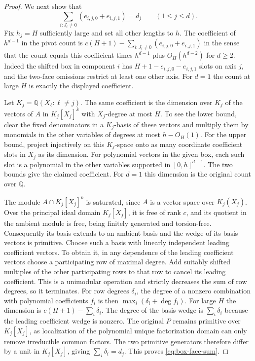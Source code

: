 \documentclass[11pt,a4paper,reqno]{amsart}
\theoremstyle{definition}
\theoremstyle{remark}
\numberwithin{equation}{section}
\begin{document}
\begin{proof}
We next show that
\begin{equation}\label{eq:box-face-sum}
 \sum_{i:J_i\ne0}(e_{i,j,0}+e_{i,j,1})=d_j
 \qquad (1\leq j\leq d).
\end{equation}
Fix \(h_j=H\) sufficiently large and set all other lengths to \(h\).
The coefficient of \(h^{d-1}\) in the pivot count is
\(c(H+1)-\sum_{i:J_i\ne0}(e_{i,j,0}+e_{i,j,1})\)
in the sense that the count equals this coefficient times \(h^{d-1}\)
plus \(O_H(h^{d-2})\) for \(d\ge2\). Indeed the shifted box in component
\(i\) has \(H+1-e_{i,j,0}-e_{i,j,1}\) slots on axis \(j\),
and the two-face omissions restrict at least one other axis.
For \(d=1\) the count at large \(H\) is exactly the displayed coefficient.

Let \(K_j=\mathbb Q(X_\ell:\ell\ne j)\). The same coefficient is the
dimension over \(K_j\) of the vectors of \(A\) in \(K_j[X_j]^k\) with
\(X_j\)-degree at most \(H\). To see the lower bound, clear the fixed
denominators in a \(K_j\)-basis of these vectors and multiply them
by monomials in the other variables of degrees at most \(h-O_H(1)\).
For the upper bound, project injectively on this \(K_j\)-space onto
as many coordinate coefficient slots in \(X_j\) as its dimension.
For polynomial vectors in the given box, each such slot is a
polynomial in the other variables supported in \([0,h]^{d-1}\).
The two bounds give the claimed coefficient. For \(d=1\) this
dimension is the original count over \(\mathbb Q\).

The module \(A\cap K_j[X_j]^k\) is saturated, since \(A\) is a vector
space over \(K_j(X_j)\). Over the principal ideal domain \(K_j[X_j]\),
it is free of rank \(c\), and its quotient in the ambient module is
free, being finitely generated and torsion-free. Consequently its
basis extends to an ambient basis and the wedge of its basis vectors
is primitive. Choose such a basis with linearly independent leading
coefficient vectors. To obtain it, in any dependence of the leading
coefficient vectors choose a participating row of maximal degree.
Add suitably shifted multiples of the other participating rows to
that row to cancel its leading coefficient. This is a unimodular
operation and strictly decreases the sum of row degrees, so it
terminates. For row degrees \(\delta_i\), the degree of a nonzero
combination with polynomial coefficients \(f_i\) is then
\(\max_i(\delta_i+\deg f_i)\). For large \(H\) the dimension is
\(c(H+1)-\sum_i\delta_i\). The degree of the basis wedge is
\(\sum_i\delta_i\) because the leading coefficient wedge is nonzero.
The original \(P\) remains primitive over \(K_j[X_j]\), as localization
of the polynomial unique factorization domain can only remove
irreducible common factors. The two primitive generators therefore
differ by a unit in \(K_j[X_j]\), giving \(\sum_i\delta_i=d_j\).
This proves \eqref{eq:box-face-sum}.


\end{proof}
\end{document}
